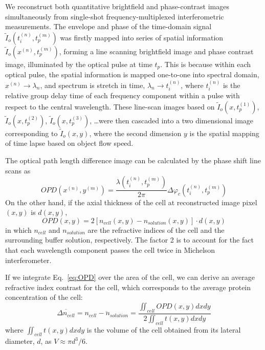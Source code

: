 \documentclass[aps,pra,reprint,superscriptaddress]{revtex4-1}
\begin{document}
We reconstruct both quantitative brightfield and phase-contrast images simultaneously from single-shot frequency-multiplexed interferometric measurements. The envelope and phase of the time-domain signal $\tilde{I}_o (t_i^{(n)}, t_p^{(m)})$ was firstly mapped into series of spatial information $\tilde{I}_o(x^{(n)},t_p^{(m)})$, forming a line scanning brightfield image and phase contrast image, illuminated by the optical pulse at time $t_p$. This is because within each optical pulse, the spatial information is mapped one-to-one into spectral domain, $x^{(n)} \rightarrow \lambda_n$, and spectrum is stretch in time, $\lambda_n \rightarrow t_i^{(n)}$, where $t_i^{(n)}$ is the relative group delay time of each frequency component within a pulse with respect to the central wavelength. These line-scan images based on $\tilde{I}_o(x,t_p^{(1)})$, $\tilde{I}_o (x, t_p^{(2)})$, $\tilde{I}_o(x,t_p^{(3)})$, \ldots were then cascaded into a two dimensional image corresponding to $\tilde{I}_o(x,y)$, where the second dimension $y$ is the spatial mapping of time lapse based on object flow speed. 

The optical path length difference image can be calculated by the phase shift line scans as
\begin{equation}
OPD(x^{(n)},y^{(m)}) = \frac{\lambda(t_i^{(n)},t_p^{(m)})}{2\pi} \Delta\varphi_c(t_i^{(n)},t_p^{(m)})
\end{equation}
On the other hand, if the axial thickness of the cell at reconstructed image pixel $(x,y)$ is $d(x,y)$,
\begin{equation} \label{eq:OPD}
OPD(x,y) = 2 [n_{cell}(x,y) - n_{solution}(x,y)] \cdot d(x,y)
\end{equation}
in which $n_{cell}$ and $n_{solution}$ are the refractive indices of the cell and the surrounding buffer solution, respectively. The factor 2 is to account for the fact that each wavelength component passes the cell twice in Michelson interferometer. 

If we integrate Eq.~\ref{eq:OPD} over the area of the cell, we can derive an average refractive index contrast for the cell, which corresponds to the average protein concentration of the cell:
\begin{equation}
\overline{\Delta n_{cell}} = \overline{n_{cell} - n_{solution}} = \frac{\iint_{cell} OPD(x,y) dx dy}{2 \iint_{cell} t(x,y) dx dy}
\end{equation}
where $\iint_{cell} t(x,y) dx dy$ is the volume of the cell obtained from its lateral diameter, $d$, as $V \approx \pi d^3/6$. 
\end{document}
